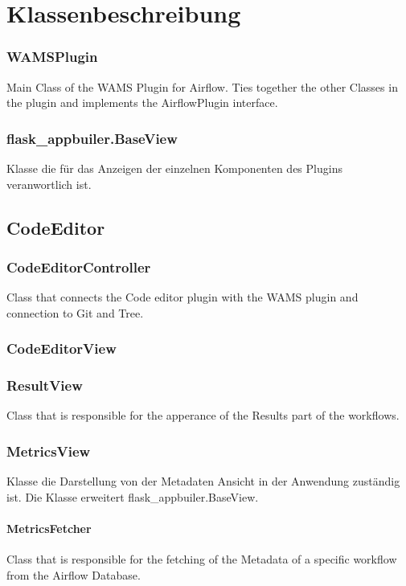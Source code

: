 \chapter{Klassenbeschreibung}
\subsection{WAMSPlugin}
Main Class of the WAMS Plugin for Airflow. Ties together the other Classes in the plugin and implements the AirflowPlugin interface.

\subsection{flask\_appbuiler.BaseView}
Klasse die für das Anzeigen der einzelnen Komponenten des Plugins veranwortlich ist.

\section{CodeEditor}
\subsection{CodeEditorController}
Class that connects the Code editor plugin with the WAMS plugin and connection to Git and Tree.

\subsection{CodeEditorView}

\subsection{ResultView}
Class that is responsible for the apperance of the Results part of the workflows. 

\subsection{MetricsView}
Klasse die Darstellung von der Metadaten Ansicht in der Anwendung zuständig ist. 
Die Klasse erweitert flask\_appbuiler.BaseView.

\subsubsection{MetricsFetcher}
Class that is responsible for the fetching of the Metadata of a specific workflow from the Airflow Database.

